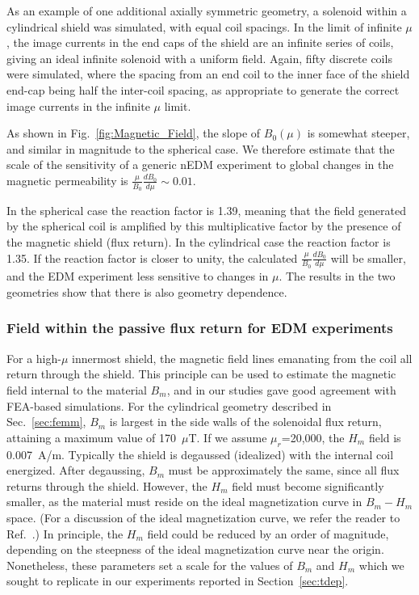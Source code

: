 As an example of one additional axially symmetric geometry, a solenoid
within a cylindrical shield was simulated, with equal coil spacings.
In the limit of infinite $\mu$, the image currents in the end caps of
the shield are an infinite series of coils, giving an ideal infinite
solenoid with a uniform field.  Again, fifty discrete coils were
simulated, where the spacing from an end coil to the inner face of the
shield end-cap being half the inter-coil spacing, as appropriate to
generate the correct image currents in the infinite $\mu$ limit. 

As shown in Fig.~\ref{fig:Magnetic_Field}, the slope of $B_0(\mu)$ is
somewhat steeper, and similar in magnitude to the spherical case.  We
therefore estimate that the scale of the sensitivity of a generic nEDM
experiment to global changes in the magnetic permeability is
$\frac{\mu}{B_0}\frac{dB_0}{d\mu}\sim 0.01$.

In the spherical case the reaction factor is 1.39, meaning that the
field generated by the spherical coil is amplified by this
multiplicative factor by the presence of the magnetic shield (flux
return).  In the cylindrical case the reaction factor is 1.35.  If the
reaction factor is closer to unity, the calculated
$\frac{\mu}{B_0}\frac{dB_0}{d\mu}$ will be smaller, and the EDM
experiment less sensitive to changes in $\mu$.  The results in the two
geometries show that there is also geometry dependence.


\subsubsection{Field within the passive flux return for EDM experiments}

For a high-$\mu$ innermost shield, the magnetic field lines emanating
from the coil all return through the shield.  This principle can be
used to estimate the magnetic field internal to the material $B_m$,
and in our studies gave good agreement with FEA-based simulations.
For the cylindrical geometry described in Sec.~\ref{sec:femm}, $B_m$
is largest in the side walls of the solenoidal flux return, attaining
a maximum value of 170~$\mu$T.  If we assume $\mu_r$=20,000, the $H_m$
field is 0.007~A/m.  Typically the shield is degaussed (idealized)
with the internal coil energized.  After degaussing, $B_m$ must be
approximately the same, since all flux returns through the shield.
However, the $H_m$ field must become significantly smaller, as the
material must reside on the ideal magnetization curve in $B_m-H_m$
space.  (For a discussion of the ideal magnetization curve, we refer
the reader to Ref.~\cite{bib:bozorth}.)  In principle, the $H_m$ field
could be reduced by an order of magnitude, depending on the steepness
of the ideal magnetization curve near the origin.  Nonetheless, these
parameters set a scale for the values of $B_m$ and $H_m$ which we
sought to replicate in our experiments reported in
Section~\ref{sec:tdep}.




